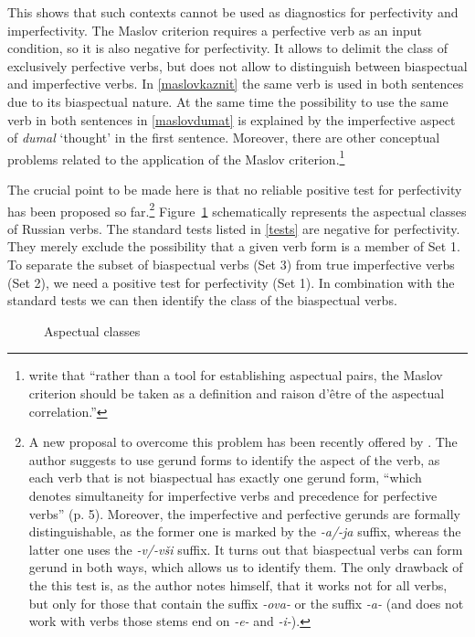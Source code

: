 This shows that such contexts cannot be used as diagnostics for perfectivity and imperfectivity. The Maslov criterion requires a perfective verb as an input condition, so it is also negative for perfectivity. It allows to delimit the class of exclusively perfective verbs, but does not allow to distinguish between biaspectual and imperfective verbs. In \ref{maslovkaznit} the same verb is used in both sentences due to its biaspectual nature. At the same time the possibility to use the same verb in both sentences in \ref{maslovdumat} is explained by the imperfective aspect of \textit{dumal} `thought' in the first sentence. Moreover, there are other conceptual problems related to the application of the Maslov criterion.\footnote{\citet[2]{Mikaelian:07} write that ``rather than a tool for establishing aspectual pairs, the Maslov criterion should be taken as a definition and raison d'\^etre of the aspectual correlation.''}

The crucial point to be made here is that no reliable positive test for perfectivity has been proposed so far.\footnote{A new proposal to overcome this problem has been recently offered by \citet{Piperski:biasp}. The author suggests to use gerund forms to identify the aspect of the verb, as each verb that is not biaspectual has exactly one gerund form, ``which denotes simultaneity for imperfective verbs and precedence for perfective verbs'' (p. 5). Moreover, the imperfective  and perfective gerunds are formally distinguishable, as the former one is marked by the \textit{-a/-ja} suffix, whereas the latter one uses the \textit{-v/-v\v{s}i} suffix. It turns out that biaspectual verbs can form gerund in both ways, which allows us to identify them. The only drawback of the this test is, as the author notes himself, that it works not for all verbs, but only for those that contain the suffix \textit{-ova-} or the suffix \textit{-a-} (and does not work with verbs those stems end on \textit{-e-} and \textit{-i-}).} Figure~\ref{circles} schematically represents the aspectual classes of Russian verbs. The standard tests listed in \ref{tests} are negative for perfectivity. They merely exclude the possibility that a given verb form is a member of Set 1. To separate the subset of biaspectual verbs (Set 3) from true imperfective verbs (Set 2), we need a positive test for perfectivity (Set 1). In combination with the standard tests we can then identify the class of the biaspectual verbs.\largerpage

\begin{figure}
\caption{\label{circles}Aspectual classes}
\end{figure}

